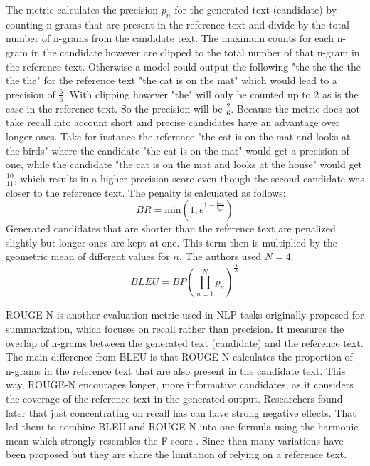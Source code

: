 The metric calculates the precision $p_n$ for the generated text (candidate) by counting n-grams that are present in the reference text and divide by the total number of n-grams from the candidate text. The maximum counts for each n-gram in the candidate however are clipped to the total number of that n-gram in the reference text. Otherwise a model could output the following "the the the the the the" for the reference text "the cat is on the mat" which would lead to a precision of $\frac{6}{6}$. With clipping however "the" will only be counted up to 2 as is the case in the reference text. So the precision will be $\frac{2}{6}$. Because the metric does not take recall into account short and precise candidates have an advantage over longer ones. Take for instance the reference "the cat is on the mat and looks at the birds" where the candidate "the cat is on the mat" would get a precision of one, while the candidate "the cat is on the mat and looks at the house" would get $\frac{10}{11}$, which results in a higher precision score even though the second candidate was closer to the reference text. The penalty is calculated as follows:
\begin{equation}
    BR = \text{min}(1, e^{1-\frac{l_{ref}}{l_{gen}}})
\end{equation}
Generated candidates that are shorter than the reference text are penalized slightly but longer ones are kept at one. This term then is multiplied by the geometric mean of different values for $n$. The authors used $N=4$.
\begin{equation}
    BLEU = BP \left(\prod_{n=1}^N p_n\right)^{\frac{1}{N}}
\end{equation}

ROUGE-N \cite{lin2004rouge} is another evaluation metric used in NLP tasks originally proposed for summarization, which focuses on recall rather than precision. It measures the overlap of n-grams between the generated text (candidate) and the reference text. The main difference from BLEU is that ROUGE-N calculates the proportion of n-grams in the reference text that are also present in the candidate text. This way, ROUGE-N encourages longer, more informative candidates, as it considers the coverage of the reference text in the generated output. Researchers found later that just concentrating on recall has can have strong negative effects. That led them to combine BLEU and ROUGE-N into one formula using the harmonic mean which strongly resembles the F-score \cite[p. 152]{tunstall2022transformers}. Since then many variations have been proposed but they are share the limitation of relying on a reference text.

